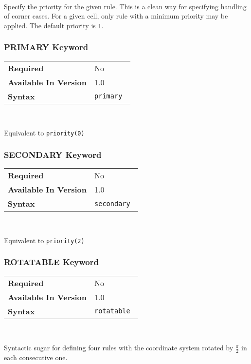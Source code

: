 \documentclass[11pt]{article}
\begin{document}
~

\noindent Specify the priority for the given rule.  This is a clean way for
specifying handling of corner cases.  For a given cell, only rule with a
minimum priority may be applied.  The default priority is $1$.

\subsubsection{PRIMARY Keyword}
\begin{tabular}{| l | l |}
\hline
\bf Required & No                          \\
\bf Available In Version & 1.0             \\
\bf Syntax & \tt primary             \\
\hline
\end{tabular}

~

\noindent Equivalent to {\tt priority(0)}

\subsubsection{SECONDARY Keyword}
\begin{tabular}{| l | l |}
\hline
\bf Required & No                          \\
\bf Available In Version & 1.0             \\
\bf Syntax & \tt secondary \\
\hline
\end{tabular}

~

\noindent Equivalent to {\tt priority(2)}

\subsubsection{ROTATABLE Keyword}
\begin{tabular}{| l | l |}
\hline
\bf Required & No                          \\
\bf Available In Version & 1.0             \\
\bf Syntax & \tt rotatable \\
\hline
\end{tabular}

~

\noindent Syntactic sugar for defining four rules with the coordinate 
system rotated by $\frac \pi 2$ in each consecutive one.
\end{document}
